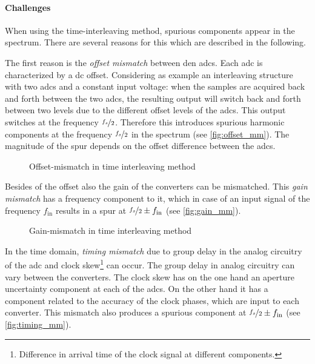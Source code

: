 \clearpage
\paragraph{Challenges}
When using the time-interleaving method, spurious components appear in the spectrum. There are several reasons for this which are described in the following.

The first reason is the \textit{offset mismatch} between den \glspl{adc}. 
Each \gls{adc} is characterized by a \gls{dc} offset. 
Considering as example an interleaving structure with two \glspl{adc} and a constant input voltage: when the samples are acquired back and forth between the two \glspl{adc}, the resulting output will switch back and forth between two levels due to the different offset levels of the \glspl{adc}. 
This output switches at the frequency $\nicefrac{f_s}{2}$. 
Therefore this introduces spurious harmonic components at the frequency $\nicefrac{f_s}{2}$ in the spectrum (see \autoref{fig:offset_mm}). 
The magnitude of the spur depends on the offset difference between the \glspl{adc}. \cite{Harris2019}
\begin{figure}[H]
	\centering
	\resizebox{1\textwidth}{!}{}
	\caption{Offset-mismatch in time interleaving method \cite{Harris2019}}
	\label{fig:offset_mm}
\end{figure}

Besides of the offset also the gain of the converters can be mismatched. 
This \textit{gain mismatch} has a frequency component to it, which in case of an input signal of the frequency $f_{\text{in}}$ results in a spur at $\nicefrac{f_s}{2} \pm f_{\text{in}}$ (see \autoref{fig:gain_mm}). \cite{Harris2019}


\begin{figure}[H]
	\centering
	\resizebox{1\textwidth}{!}{}
	\caption{Gain-mismatch in time interleaving method \cite{Harris2019}}
	\label{fig:gain_mm}
\end{figure}

In the time domain, \textit{timing mismatch} due to group delay in the analog circuitry of the \gls{adc} and clock skew\footnote{Difference in arrival time of the clock signal at different components.} can occur. 
The group delay in analog circuitry can vary between the converters. 
The clock skew has on the one hand an aperture uncertainty component at each of the \glspl{adc}. 
On the other hand it has a component related to the accuracy of the clock phases, which are input to each converter. 
This mismatch also produces a spurious component at $\nicefrac{f_s}{2} \pm f_\text{in}$ (see \autoref{fig:timing_mm}). \cite{Harris2019} 

